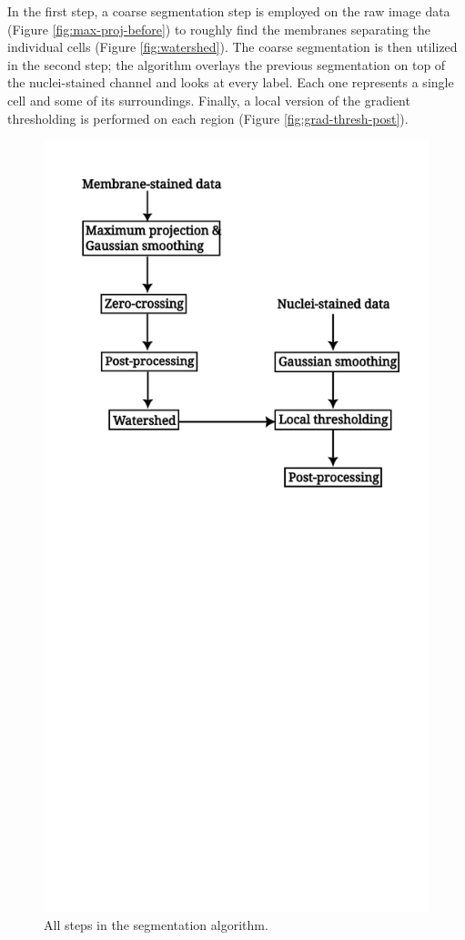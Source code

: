 \documentclass[
  digital,     %
  oneside,     %
  nosansbold,  %
  nocolorbold, %
  lof,         %
  lot,         %
]{fithesis4}
\begin{document}
In the first step, a coarse segmentation step is employed on the raw image data (Figure \ref{fig:max-proj-before}) to roughly find the membranes separating the individual cells (Figure \ref{fig:watershed}). The coarse segmentation is then utilized in the second step; the algorithm overlays the previous
segmentation on top of the nuclei-stained channel and looks at every label.
Each one represents a single cell and some of its surroundings. Finally, a
local version of the gradient thresholding is performed on each region (Figure \ref{fig:grad-thresh-post}).
\begin{figure}
    \begin{center}
        \includegraphics[width=0.8\linewidth]{./resources/inkscape/segmentation-steps.png}
    \end{center}
    \caption{All steps in the segmentation algorithm.}
    \label{fig:segmentation_steps}
\end{figure}
\end{document}
